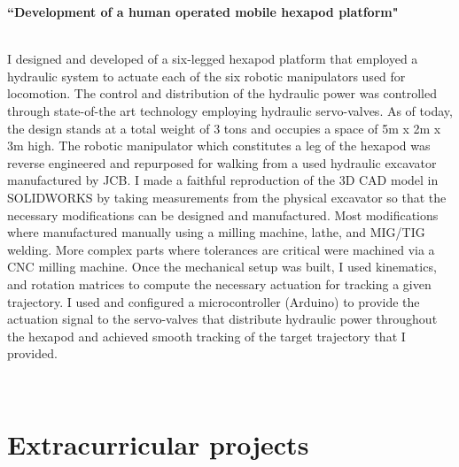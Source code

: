 \documentclass[10pt]{article} %
\begin{document}
{\raggedright\textbf{``Development of a human operated mobile hexapod platform"}}\\
I designed and developed of a six-legged hexapod platform that employed a hydraulic system to actuate each of the six robotic manipulators used for locomotion. The control and distribution of the hydraulic power was controlled through state-of-the art technology employing hydraulic servo-valves. As of today, the design stands at a total weight of 3 tons and occupies a space of 5m x 2m x 3m high. The robotic manipulator which constitutes a leg of the hexapod was reverse engineered and repurposed for walking from a used hydraulic excavator manufactured by JCB. I made a faithful reproduction of the 3D CAD model in SOLIDWORKS by taking measurements from the physical excavator so that the necessary modifications can be designed and manufactured. Most modifications where manufactured manually using a milling machine, lathe, and MIG/TIG welding. More complex parts where tolerances are critical were machined via a CNC milling machine. Once the mechanical setup was built, I used kinematics, and rotation matrices to compute the necessary actuation for tracking a given trajectory. I used and configured a microcontroller (Arduino) to provide the actuation signal to the servo-valves that distribute hydraulic power throughout the hexapod and achieved smooth tracking of the target trajectory that I provided.

~~~~~

\medskip %

\newpage
\section{Extracurricular projects}
\end{document}

